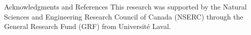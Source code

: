 \documentclass[final,hyperref={pdfpagelabels=false}]{beamer}
\begin{document}
\begin{frame}[t]
\begin{columns}[t]
\begin{column}{.465\textwidth}

\begin{block}{Acknowledgments and References}
\footnotesize%
\noindent This research was supported by the Natural Sciences and Engineering Research Council of Canada (NSERC) through the General Research Fund (GRF) from Université Laval.
\nocite{*} %
%
{\footnotesize}
\vspace{-3mm}
\end{block}

%
%
%
%


\end{column} %

\begin{column}{.015\textwidth}\end{column} %
\end{columns} %
%

\end{frame} %
\end{document}

